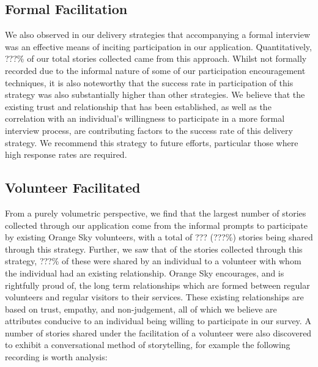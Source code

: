 \subsection{Formal Facilitation}

We also observed in our delivery strategies that accompanying a formal interview was an effective means of inciting participation in our application. Quantitatively, ???\% of our total stories collected came from this approach. Whilst not formally recorded due to the informal nature of some of our participation encouragement techniques, it is also noteworthy that the success rate in participation of this strategy was also substantially higher than other strategies. We believe that the existing trust and relationship that has been established, as well as the correlation with an individual's willingness to participate in a more formal interview process, are contributing factors to the success rate of this delivery strategy. We recommend this strategy to future efforts, particular those where high response rates are required.

\subsection{Volunteer Facilitated}

From a purely volumetric perspective, we find that the largest number of stories collected through our application come from the informal prompts to participate by existing Orange Sky volunteers, with a total of ??? (???\%) stories being shared through this strategy. Further, we saw that of the stories collected through this strategy, ???\% of these were shared by an individual to a volunteer with whom the individual had an existing relationship. Orange Sky encourages, and is rightfully proud of, the long term relationships which are formed between regular volunteers and regular visitors to their services. These existing relationships are based on trust, empathy, and non-judgement, all of which we believe are attributes conducive to an individual being willing to participate in our survey. A number of stories shared under the facilitation of a volunteer were also discovered to exhibit a conversational method of storytelling, for example the following recording is worth analysis:

